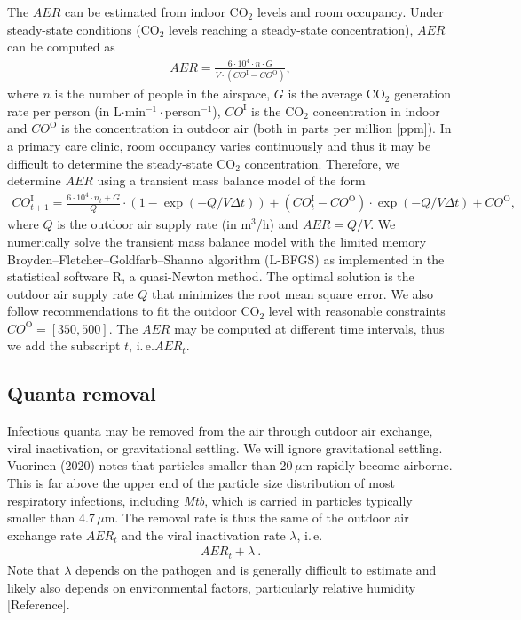 \documentclass[fleqn,11pt]{wlscirep_supp}
\newcommand\ie{i.\,e.\xspace}
\begin{document}
The $AER$ can be estimated from indoor CO$_2$ levels and room occupancy. Under steady-state conditions (CO$_2$ levels reaching a steady-state concentration), $AER$ can be computed as
\begin{align}
    AER = \frac{6\cdot10^4 \cdot n \cdot G}{V\cdot(CO^{\text{I}}-CO^{\text{O}})},
\end{align}
where $n$ is the number of people in the airspace, $G$ is the average CO$_2$ generation rate per person (in L$\cdot$min$^{-1}\cdot$person$^{-1}$), $CO^{\text{I}}$ is the CO$_2$ concentration in indoor and $CO^{\text{O}}$ is the concentration in outdoor air (both in parts per million [ppm])\cite{Batterman2017IJERPH}. In a primary care clinic, room occupancy varies continuously and thus it may be difficult to determine the steady-state CO$_2$ concentration. Therefore, we determine $AER$ using a transient mass balance model of the form\cite{Batterman2017IJERPH}
\begin{align}
    CO_{t+1}^{\text{I}} = \frac{6\cdot10^4 \cdot n_t + G}{Q} \cdot \left(1 - \exp(-Q/V \Delta t)\right) + (CO_t^{\text{I}}-CO^{\text{O}}) \cdot \exp(-Q/V \Delta t) + CO^{\text{O}},
\end{align}
where $Q$ is the outdoor air supply rate (in m$^3$/h) and $AER = Q/V$. We numerically solve the transient mass balance model with the limited memory Broyden–Fletcher–Goldfarb–Shanno algorithm (L-BFGS) as implemented in the statistical software R\cite{Byrd1995SIAM}, a quasi-Newton method. The optimal solution is the outdoor air supply rate $Q$ that minimizes the root mean square error. We also follow recommendations to fit the outdoor CO$_2$ level with reasonable constraints $CO^{\text{O}} = [350,500]$\cite{Batterman2017IJERPH}. The $AER$ may be computed at different time intervals, thus we add the subscript $t$, \ie $AER_t$.

\subsection{Quanta removal}\label{sec:quanta-removal}

Infectious quanta may be removed from the air through outdoor air exchange, viral inactivation, or gravitational settling. We will ignore gravitational settling. Vuorinen (2020)\cite{Vuorinen2020SafSci} notes that particles smaller than 20\,$\mu$m rapidly become airborne. This is far above the upper end of the particle size distribution of most respiratory infections, including \emph{Mtb}, which is carried in particles typically smaller than 4.7\,$\mu$m\cite{Fennelly2020Lancet}. The removal rate is thus the same of the outdoor air exchange rate $AER_t$ and the viral inactivation rate $\lambda$, \ie 
\begin{align}\label{eq:removal}
    AER_t + \lambda ~.
\end{align}
Note that $\lambda$ depends on the pathogen and is generally difficult to estimate and likely also depends on environmental factors, particularly relative humidity [Reference]. 
\end{document}
